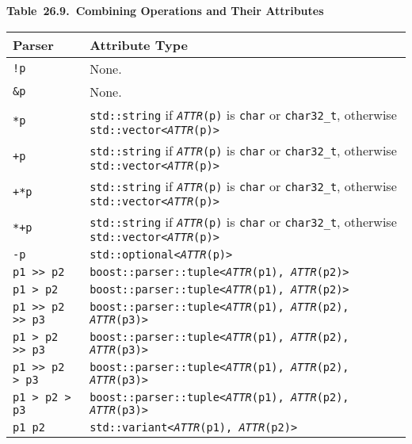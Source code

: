\textbf{Table~26.9.~Combining Operations and Their Attributes}

\begin{longtable}[]{@{}ll@{}}
\toprule\noalign{}
Parser & Attribute Type \\
\midrule\noalign{}
\endhead
\bottomrule\noalign{}
\endlastfoot
\texttt{!p} & None. \\
\texttt{\&p} & None. \\
\texttt{*p} & \texttt{std::string} if \emph{\texttt{ATTR}}\texttt{(p)} is \texttt{char} or \texttt{char32\_t}, otherwise \texttt{std::vector<}\emph{\texttt{ATTR}}\texttt{(p)>} \\
\texttt{+p} & \texttt{std::string} if \emph{\texttt{ATTR}}\texttt{(p)} is \texttt{char} or \texttt{char32\_t}, otherwise \texttt{std::vector<}\emph{\texttt{ATTR}}\texttt{(p)>} \\
\texttt{+*p} & \texttt{std::string} if \emph{\texttt{ATTR}}\texttt{(p)} is \texttt{char} or \texttt{char32\_t}, otherwise \texttt{std::vector<}\emph{\texttt{ATTR}}\texttt{(p)>} \\
\texttt{*+p} & \texttt{std::string} if \emph{\texttt{ATTR}}\texttt{(p)} is \texttt{char} or \texttt{char32\_t}, otherwise \texttt{std::vector<}\emph{\texttt{ATTR}}\texttt{(p)>} \\
\texttt{-p} & \texttt{std::optional<}\emph{\texttt{ATTR}}\texttt{(p)>} \\
\texttt{p1 >> p2} & \texttt{boost::parser::tuple<}\emph{\texttt{ATTR}}\texttt{(p1), }\emph{\texttt{ATTR}}\texttt{(p2)>} \\
\texttt{p1 > p2} & \texttt{boost::parser::tuple<}\emph{\texttt{ATTR}}\texttt{(p1), }\emph{\texttt{ATTR}}\texttt{(p2)>} \\
\texttt{p1 >> p2 >> p3} & \texttt{boost::parser::tuple<}\emph{\texttt{ATTR}}\texttt{(p1), }\emph{\texttt{ATTR}}\texttt{(p2), }\emph{\texttt{ATTR}}\texttt{(p3)>} \\
\texttt{p1 > p2 >> p3} & \texttt{boost::parser::tuple<}\emph{\texttt{ATTR}}\texttt{(p1), }\emph{\texttt{ATTR}}\texttt{(p2), }\emph{\texttt{ATTR}}\texttt{(p3)>} \\
\texttt{p1 >> p2 > p3} & \texttt{boost::parser::tuple<}\emph{\texttt{ATTR}}\texttt{(p1), }\emph{\texttt{ATTR}}\texttt{(p2), }\emph{\texttt{ATTR}}\texttt{(p3)>} \\
\texttt{p1 > p2 > p3} & \texttt{boost::parser::tuple<}\emph{\texttt{ATTR}}\texttt{(p1), }\emph{\texttt{ATTR}}\texttt{(p2), }\emph{\texttt{ATTR}}\texttt{(p3)>} \\
\texttt{p1 \textbar{} p2} & \texttt{std::variant<}\emph{\texttt{ATTR}}\texttt{(p1), }\emph{\texttt{ATTR}}\texttt{(p2)>} \\

\end{longtable}
